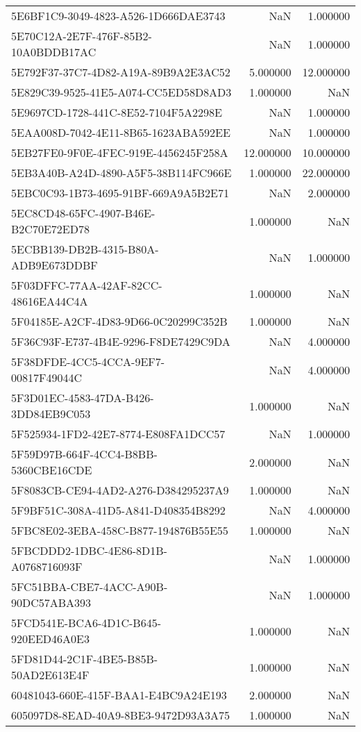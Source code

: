 \begin{tabular}{lrr}
5E6BF1C9-3049-4823-A526-1D666DAE3743 & NaN & 1.000000 \\
5E70C12A-2E7F-476F-85B2-10A0BDDB17AC & NaN & 1.000000 \\
5E792F37-37C7-4D82-A19A-89B9A2E3AC52 & 5.000000 & 12.000000 \\
5E829C39-9525-41E5-A074-CC5ED58D8AD3 & 1.000000 & NaN \\
5E9697CD-1728-441C-8E52-7104F5A2298E & NaN & 1.000000 \\
5EAA008D-7042-4E11-8B65-1623ABA592EE & NaN & 1.000000 \\
5EB27FE0-9F0E-4FEC-919E-4456245F258A & 12.000000 & 10.000000 \\
5EB3A40B-A24D-4890-A5F5-38B114FC966E & 1.000000 & 22.000000 \\
5EBC0C93-1B73-4695-91BF-669A9A5B2E71 & NaN & 2.000000 \\
5EC8CD48-65FC-4907-B46E-B2C70E72ED78 & 1.000000 & NaN \\
5ECBB139-DB2B-4315-B80A-ADB9E673DDBF & NaN & 1.000000 \\
5F03DFFC-77AA-42AF-82CC-48616EA44C4A & 1.000000 & NaN \\
5F04185E-A2CF-4D83-9D66-0C20299C352B & 1.000000 & NaN \\
5F36C93F-E737-4B4E-9296-F8DE7429C9DA & NaN & 4.000000 \\
5F38DFDE-4CC5-4CCA-9EF7-00817F49044C & NaN & 4.000000 \\
5F3D01EC-4583-47DA-B426-3DD84EB9C053 & 1.000000 & NaN \\
5F525934-1FD2-42E7-8774-E808FA1DCC57 & NaN & 1.000000 \\
5F59D97B-664F-4CC4-B8BB-5360CBE16CDE & 2.000000 & NaN \\
5F8083CB-CE94-4AD2-A276-D384295237A9 & 1.000000 & NaN \\
5F9BF51C-308A-41D5-A841-D408354B8292 & NaN & 4.000000 \\
5FBC8E02-3EBA-458C-B877-194876B55E55 & 1.000000 & NaN \\
5FBCDDD2-1DBC-4E86-8D1B-A0768716093F & NaN & 1.000000 \\
5FC51BBA-CBE7-4ACC-A90B-90DC57ABA393 & NaN & 1.000000 \\
5FCD541E-BCA6-4D1C-B645-920EED46A0E3 & 1.000000 & NaN \\
5FD81D44-2C1F-4BE5-B85B-50AD2E613E4F & 1.000000 & NaN \\
60481043-660E-415F-BAA1-E4BC9A24E193 & 2.000000 & NaN \\
605097D8-8EAD-40A9-8BE3-9472D93A3A75 & 1.000000 & NaN \\

\end{tabular}
